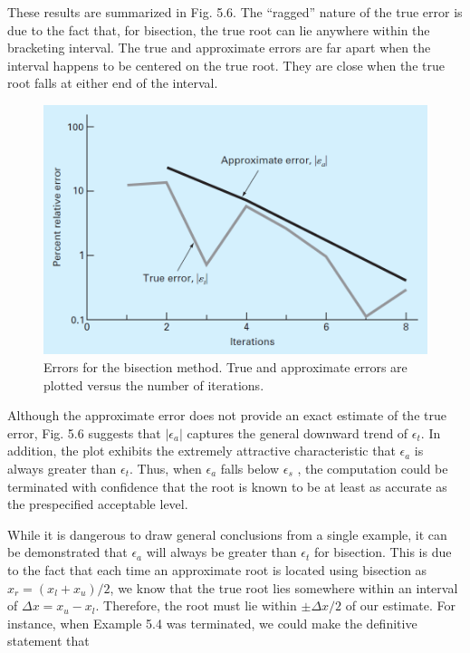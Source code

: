 \documentclass[../main.tex]{subfiles}
\begin{document}
\begin{example}
    These results are summarized in Fig. 5.6. The ``ragged'' nature of the true error is due
    to the fact that, for bisection, the true root can lie anywhere within the bracketing interval.
    The true and approximate errors are far apart when the interval happens to be centered
    on the true root. They are close when the true root falls at either end of the interval.

    \begin{figure}[h]
        \includegraphics[width=0.8\linewidth]{./images/fig_5_6}
        \caption{Errors for the bisection method. True and approximate errors are plotted versus the number
        of iterations.}
    \end{figure}    
\end{example}

Although the approximate error does not provide an exact estimate of the true error,
Fig. 5.6 suggests that $\left\lvert \epsilon_a \right\rvert $ captures the general downward trend of $\epsilon_t$. In addition, the plot
exhibits the extremely attractive characteristic that $\epsilon_a$ is always greater than $\epsilon_t$. Thus,
when $\epsilon_a$ falls below $\epsilon_s$ , the computation could be terminated with confidence that the root
is known to be at least as accurate as the prespecified acceptable level.

While it is dangerous to draw general conclusions from a single example, it can be
demonstrated that $\epsilon_a$ will always be greater than $\epsilon_t$ for bisection. This is due to the fact
that each time an approximate root is located using bisection as $x_r = (x_l + x_u)/2$, we know
that the true root lies somewhere within an interval of $\Delta x = x_u - x_l$. Therefore, the root
must lie within $\pm\Delta x/2$ of our estimate. For instance, when Example 5.4 was terminated,
we could make the definitive statement that\\
\end{document}
